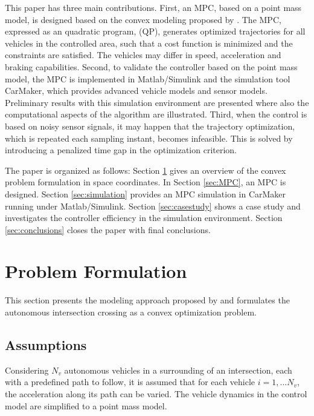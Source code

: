 \documentclass[letterpaper,10pt,conference]{ieeeconf}
\begin{document}
This paper has three main contributions. First, an MPC, based on a
point mass model, is designed
based on the convex modeling proposed by \cite{nikolce}. The MPC,
expressed as an quadratic program, (QP),
generates optimized trajectories for all vehicles in the controlled
area, such that a cost function is minimized and the constraints are
satisfied. The vehicles may differ in speed, acceleration and braking
capabilities. 
Second, to validate the controller based on the point mass model,
the MPC is implemented in Matlab/Simulink and the simulation
tool CarMaker, which provides advanced vehicle models and sensor
models. Preliminary results with this simulation environment are
presented where also the computational aspects of the algorithm are
illustrated. Third, when the control is based on noisy sensor signals,
it may happen that the trajectory optimization, which is repeated each
sampling instant, becomes infeasible. This is solved by introducing a penalized
time gap in the optimization criterion.

The paper is organized as follows: Section \ref{sec:problem_formulation} gives an overview of the convex problem formulation in space coordinates. In Section \ref{sec:MPC}, an MPC is designed. Section \ref{sec:simulation} provides an MPC simulation in CarMaker running under Matlab/Simulink. Section \ref{sec:casestudy} shows a case study and investigates the controller efficiency in the simulation environment. Section \ref{sec:conclusions} closes the paper with final conclusions.

\section{Problem Formulation} \label{sec:problem_formulation}
This section presents the modeling approach proposed by \cite{nikolce} and formulates the autonomous intersection crossing as a convex optimization problem.

\subsection{Assumptions}
Considering $N_v$ autonomous vehicles in a surrounding of an intersection, each with a predefined path to follow, it is assumed that for each vehicle $i=1,...N_v$, the acceleration along its path can be varied. The vehicle dynamics in the control model are simplified to a point mass model.
\end{document}
